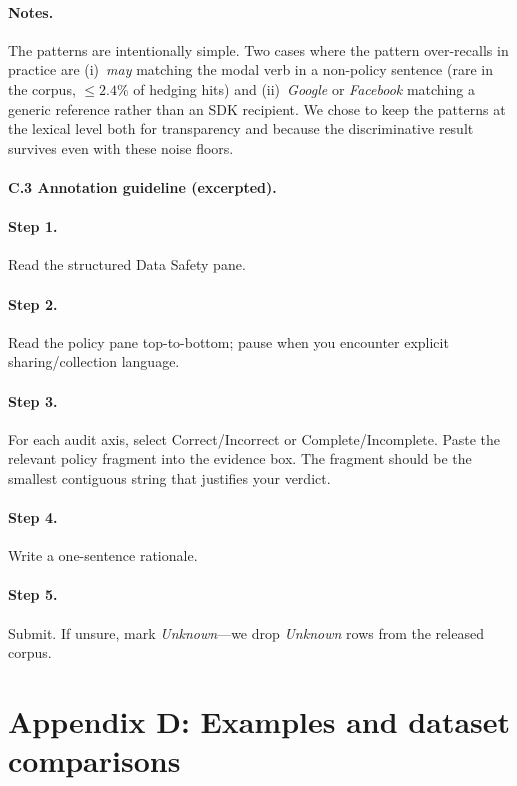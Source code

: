 \documentclass[11pt,a4paper]{article}
\begin{document}
\paragraph{Notes.} The patterns are intentionally simple. Two cases
where the pattern over-recalls in practice are
(i)~\emph{may} matching the modal verb in a non-policy sentence (rare
in the corpus, $\leq2.4\%$ of hedging hits) and (ii)~\emph{Google} or
\emph{Facebook} matching a generic reference rather than an SDK
recipient. We chose to keep the patterns at the lexical level both
for transparency and because the discriminative result survives
even with these noise floors.

\paragraph{C.3 Annotation guideline (excerpted).}
\label{app:guideline}
\paragraph{Step 1.} Read the structured Data Safety pane.
\paragraph{Step 2.} Read the policy pane top-to-bottom; pause when
you encounter explicit sharing/collection language.
\paragraph{Step 3.} For each audit axis, select Correct/Incorrect or
Complete/Incomplete. Paste the relevant policy fragment into the
evidence box. The fragment should be the smallest contiguous string
that justifies your verdict.
\paragraph{Step 4.} Write a one-sentence rationale.
\paragraph{Step 5.} Submit. If unsure, mark \emph{Unknown}---we drop
\emph{Unknown} rows from the released corpus.

\section*{Appendix D: Examples and dataset comparisons}
\end{document}
